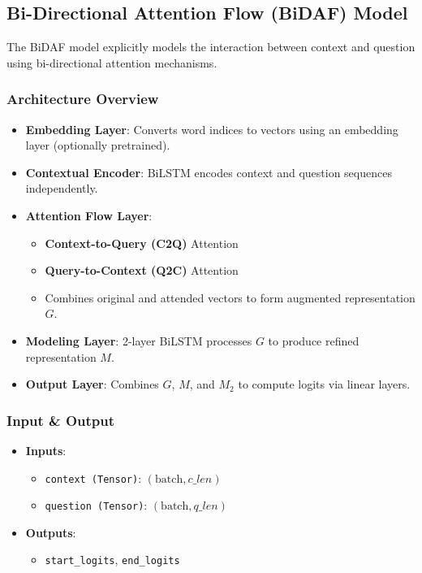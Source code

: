 \documentclass[runningheads]{llncs}
\begin{document}
\subsection{Bi-Directional Attention Flow (BiDAF) Model}  \cite{bidaf}

The BiDAF model explicitly models the interaction between context and question using bi-directional attention mechanisms.

\subsubsection{Architecture Overview}
\begin{itemize}
    \item \textbf{Embedding Layer}: Converts word indices to vectors using an embedding layer (optionally pretrained).
    \item \textbf{Contextual Encoder}: BiLSTM encodes context and question sequences independently.
    \item \textbf{Attention Flow Layer}:
    \begin{itemize}
        \item \textbf{Context-to-Query (C2Q)} Attention
        \item \textbf{Query-to-Context (Q2C)} Attention
        \item Combines original and attended vectors to form augmented representation $G$.
    \end{itemize}
    \item \textbf{Modeling Layer}: 2-layer BiLSTM processes $G$ to produce refined representation $M$.
    \item \textbf{Output Layer}: Combines $G$, $M$, and $M_2$ to compute logits via linear layers.
\end{itemize}

\subsubsection{Input \& Output}
\begin{itemize}
    \item \textbf{Inputs}:
    \begin{itemize}
        \item \texttt{context (Tensor)}: $(\text{batch}, c\_len)$
        \item \texttt{question (Tensor)}: $(\text{batch}, q\_len)$
    \end{itemize}
    \item \textbf{Outputs}:
    \begin{itemize}
        \item \texttt{start\_logits}, \texttt{end\_logits}
    \end{itemize}
\end{itemize}
\end{document}
